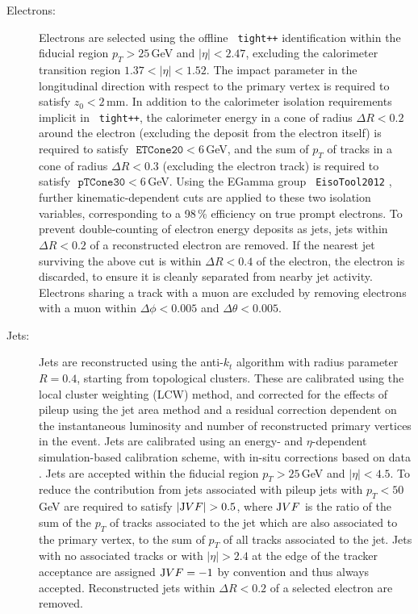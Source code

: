 \begin{description}
\item[Electrons:] Electrons are selected using the offline \texttt{ tight++} 
identification within the fiducial region $p_T>25$\,GeV and $|\eta|<2.47$, 
excluding the calorimeter transition region $1.37<|\eta|<1.52$. The impact parameter
in the longitudinal direction with respect to the primary vertex is
required to satisfy $z_0<2$\,mm. In addition 
to the calorimeter isolation requirements implicit in \texttt{ tight++},
the calorimeter energy in a cone of radius $\Delta R<0.2$ around the
electron (excluding the deposit from the electron itself) is required
to satisfy $\texttt{ ETCone20}<6$\,GeV, and the sum of $p_T$ of tracks
in a cone of radius $\Delta R<0.3$ (excluding the electron track) is
required to satisfy $\texttt{ pTCone30}<6$\,GeV. Using the
EGamma group \texttt{ EisoTool2012} \cite{eisotool}, further
kinematic-dependent cuts are applied to these two isolation variables,
corresponding to a 98\,\% efficiency on true prompt electrons. 
To prevent double-counting
of electron energy deposits as jets, jets within $\Delta R<0.2$ of 
a reconstructed electron are removed. If the nearest jet surviving
the above cut is within $\Delta R<0.4$ of the electron, the electron
is discarded, to ensure it is cleanly separated from nearby jet activity. Electrons sharing a track with a muon are excluded by removing electrons with a muon within $\Delta \phi < 0.005$ and $\Delta \theta < 0.005$.

\item[Jets:] Jets are reconstructed using the anti-$k_t$ algorithm 
\cite{antikt} with radius parameter $R=0.4$, 
starting from topological clusters. These are calibrated
using the local cluster weighting (LCW) method, and corrected for the
effects of pileup using the jet area method and a residual correction dependent
on the instantaneous luminosity and number of reconstructed primary vertices 
in the event. Jets are calibrated using an energy- and $\eta$-dependent simulation-based calibration scheme, with in-situ corrections 
based on data \cite{jesxi}. Jets are accepted within the fiducial region $p_T>25$\,GeV and $|\eta|<4.5$. To reduce the contribution from jets 
associated with pileup jets with $p_T<50$\,GeV
are required to satisfy $|\textrm JVF|>0.5$, where $\textrm JVF$ is
the ratio of the sum of the $p_T$ of tracks associated to the jet which
are also associated to the primary vertex, to the sum of $p_T$ of all
tracks associated to the jet. Jets with no associated tracks or with
$|\eta|>2.4$ at the edge of the tracker acceptance  are assigned
$\textrm JVF=-1$ by convention and thus always accepted.
Reconstructed jets 
within $\Delta R<0.2$ of a selected electron are removed.


\end{description}
